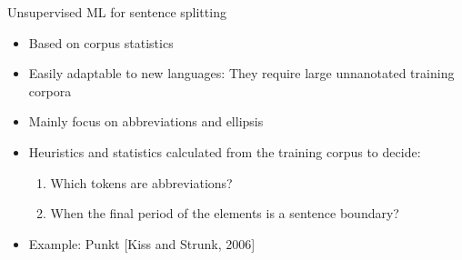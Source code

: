 \begin{frame}[containsverbatim]{Unsupervised ML for sentence splitting}
    \begin{itemize}
        \item Based on corpus statistics
        \item Easily adaptable to new languages: They require large unnanotated training corpora
        \item Mainly focus on abbreviations and ellipsis
        \item Heuristics and statistics calculated from the training corpus to decide:
        \begin{enumerate}
            \item Which tokens are abbreviations?
            \item When the final period of the elements is a sentence boundary?
        \end{enumerate}
        \item Example: Punkt [Kiss and Strunk, 2006]
    \end{itemize}
\end{frame}